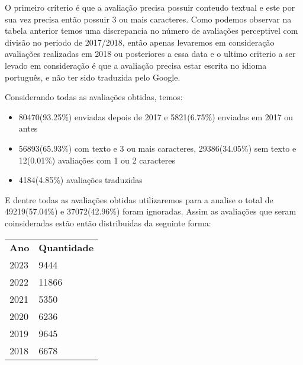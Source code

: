 O primeiro críterio é que a avaliação precisa possuir conteudo textual e este por sua vez precisa então possuir 3 ou mais caracteres. Como podemos observar na tabela anterior temos uma discrepancia no número de avaliações perceptivel com divisão no periodo de 2017/2018, então apenas levaremos em consideração avaliações realizadas em 2018 ou posteriores a essa data e o ultimo criterio a ser levado em consideração é que a avaliação precisa estar escrita no idioma português, e não ter sido traduzida pelo Google.

Considerando todas as avaliações obtidas, temos:

\begin{itemize}
	\item 80470(93.25\%) enviadas depois de 2017 e 5821(6.75\%) enviadas em 2017 ou antes
	\item 56893(65.93\%) com texto e 3 ou mais caracteres, 29386(34.05\%) sem texto e 12(0.01\%) avaliações com 1 ou 2 caracteres
	\item 4184(4.85\%) avaliações traduzidas
\end{itemize}

E dentre todas as avaliações obtidas utilizaremos para a analise o total de 49219(57.04\%) e 37072(42.96\%) foram ignoradas. Assim as avaliações que seram coinsideradas estão então distribuidas da seguinte forma:
\begin{table}[H]
	\centering
	\begin{tabular}{l|l}
		\textbf{Ano} & \textbf{Quantidade} \\
		2023         & 9444                \\
		2022         & 11866               \\
		2021         & 5350                \\
		2020         & 6236                \\
		2019         & 9645                \\
		2018         & 6678
	\end{tabular}
\end{table}

